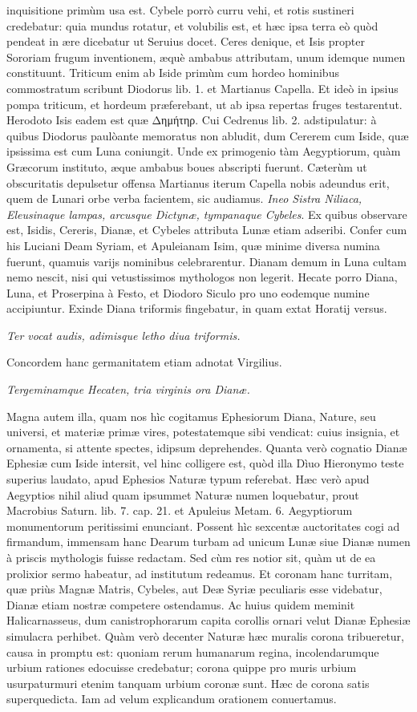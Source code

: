 \documentclass[a4paper, 11pt, oneside, polutonikogreek, latin]{article}
\begin{document}
inquisitione primùm usa est. Cybele porrò curru vehi, et rotis sustineri credebatur: quia mundus rotatur, et volubilis est, et hæc ipsa terra eò quòd pendeat in ære dicebatur ut Seruius docet. Ceres denique, et Isis propter Sororiam frugum inventionem, æquè ambabus attributam, unum idemque numen constituunt. Triticum enim ab Iside primùm cum hordeo hominibus commostratum scribunt Diodorus lib. 1. et Martianus Capella. Et ideò in ipsius pompa triticum, et hordeum præferebant, ut ab ipsa repertas fruges testarentut. Herodoto Isis eadem est quæ Δημήτηρ. Cui Cedrenus lib. 2. adstipulatur: à quibus Diodorus paulòante memoratus non abludit, dum Cererem cum Iside, quæ ipsissima est cum Luna coniungit. Unde ex primogenio tàm Aegyptiorum, quàm Græcorum instituto, æque ambabus boues abscripti fuerunt. Cæterùm ut obscuritatis depulsetur offensa Martianus iterum Capella nobis adeundus erit, quem de Lunari orbe verba facientem, sic audiamus. \emph{Ineo Sistra Niliaca, Eleusinaque lampas, arcusque Dictynæ, tympanaque Cybeles}. Ex quibus observare est, Isidis, Cereris, Dianæ, et Cybeles attributa Lunæ etiam adseribi. Confer cum his Luciani Deam Syriam, et Apuleianam Isim, quæ minime diversa numina fuerunt, quamuis varijs nominibus celebrarentur. Dianam demum in Luna cultam nemo nescit, nisi qui vetustissimos mythologos non legerit. Hecate porro Diana, Luna, et Proserpina à Festo, et Diodoro Siculo pro uno eodemque numine accipiuntur. Exinde Diana triformis fingebatur, in quam extat Horatij versus.

\emph{Ter vocat audis, adimisque letho diua triformis.}

Concordem hanc germanitatem etiam adnotat Virgilius.

\emph{Tergeminamque Hecaten, tria virginis ora Dianæ.}

Magna autem illa, quam nos hìc cogitamus Ephesiorum Diana, Nature, seu universi, et materiæ primæ vires, potestatemque sibi vendicat: cuius insignia, et ornamenta, si attente spectes, idipsum deprehendes. Quanta verò cognatio Dianæ Ephesiæ cum Iside intersit, vel hinc colligere est, quòd illa Dìuo Hieronymo teste superius laudato, apud Ephesios Naturæ typum referebat. Hæc verò apud Aegyptios nihil aliud quam ipsummet Naturæ numen loquebatur, prout Macrobius Saturn. lib. 7. cap. 21. et Apuleius Metam. 6. Aegyptiorum monumentorum peritissimi enunciant. Possent hìc sexcentæ auctoritates cogi ad firmandum, immensam hanc Dearum turbam ad unicum Lunæ siue Dianæ numen à priscis mythologis fuisse redactam. Sed cùm res notior sit, quàm ut de ea prolixior sermo habeatur, ad institutum redeamus. Et coronam hanc turritam, quæ priùs Magnæ Matris, Cybeles, aut Deæ Syriæ peculiaris esse videbatur, Dianæ etiam nostræ competere ostendamus. Ac huius quidem meminit Halicarnasseus, dum canistrophorarum capita corollis ornari velut Dianæ Ephesiæ simulacra perhibet. Quàm verò decenter Naturæ hæc muralis corona tribueretur, causa in promptu est: quoniam rerum humanarum regina, incolendarumque urbium rationes edocuisse credebatur; corona quippe pro muris urbium usurpaturmuri etenim tanquam urbium coronæ sunt. Hæc de corona satis superquedicta. Iam ad velum explicandum orationem conuertamus.
\clearpage
\end{document}
